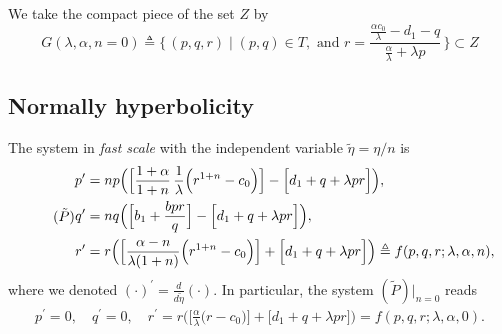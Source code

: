 \documentclass[a4paper,11pt]{article}
\begin{document}
We take the compact piece of the set $Z$ by
\begin{equation}
 G(\lambda,\alpha,n=0) \triangleq \Big\{\, (p,q,r) \;|\; (p,q) \in T, \text{ and } r=\frac{ \frac{\alpha c_0}{\lambda} - d_1 -q }{ \frac{\alpha}{\lambda} + \lambda p} \,\Big\} \subset Z
\end{equation}

\subsection*{Normally hyperbolicity}
The system in {\it fast scale} with the independent variable $\tilde{\eta} = \eta/n$ is
\begin{equation}\label{eq:pqr_fast} \tag*{($\tilde{P}$)}
\begin{aligned}
 p^\prime &=np\Big( \Big[\frac{1+\alpha}{1+n}\,\frac{1}{\lambda }\Big(r^{1+n}-c_0\Big)\Big] -\Big[d_1 + q + \lambda pr\Big]\Big), \\
 q^\prime &=nq\Big(\Big[b_1 +\frac{bpr}{q}\Big] -\Big[d_1 + q + \lambda pr\Big]\Big), \\
 r^\prime &=r\Big( \Big[\frac{\alpha-n}{\lambda(1+n)}\Big(r^{1+n}-c_0\Big)\Big]+\Big[d_1 + q + \lambda pr\Big]\Big)\triangleq f(p,q,r;\lambda,\alpha,n),
\end{aligned}
\end{equation}
where we denoted $\displaystyle(\cdot)^\prime = \frac{d}{d\tilde{\eta}}(\cdot)$. In particular, the system $(\tilde{P})|_{n=0}$ reads
\begin{align}
 p^\prime =0, \quad q^\prime =0, \quad r^\prime=r\Big( \Big[\frac{\alpha}{\lambda}\Big(r-c_0\Big)\Big]+\Big[d_1 + q + \lambda pr\Big]\Big) = f(p,q,r;\lambda,\alpha,0). \label{eq:fastn0}
\end{align}
\end{document}
